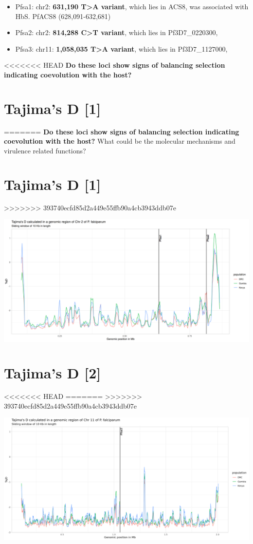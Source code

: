 \documentclass[11pt]{article}
\begin{document}
\begin{itemize}
\item Pfsa1: chr2: \textbf{631,190 T>A variant}, which lies in ACS8, was associated with HbS. PfACS8 (628,091-632,681)
\item Pfsa2: chr2: \textbf{814,288 C>T variant}, which lies in Pf3D7\_0220300,
\item Pfsa3: chr11: \textbf{1,058,035 T>A variant}, which lies in Pf3D7\_1127000,
\end{itemize}

<<<<<<< HEAD
\textbf{Do these loci show signs of balancing selection indicating coevolution with the host?}

\section{Tajima's D [1]}
\label{sec:org5204a2b}
=======
\textbf{Do these loci show signs of balancing selection indicating coevolution with the host?} What could be the molecular mechanisms and virulence related functions?

\section{Tajima's D [1]}
\label{sec:org183f418}
>>>>>>> 393740ecfd85d2a449e55ffb90a4cb3943ddb07e
\begin{center}
\includegraphics[width=.9\linewidth]{./output/TajD/png/Pf7.chr2.full.TajD_DRC_GM_KE.png}
\end{center}

\section{Tajima's D [2]}
<<<<<<< HEAD
\label{sec:org841cb6f}
=======
\label{sec:orgc2decba}
>>>>>>> 393740ecfd85d2a449e55ffb90a4cb3943ddb07e
\begin{center}
\includegraphics[width=.9\linewidth]{./output/TajD/png/Pf7.chr11.full.TajD_DRC_GM_KE.png}
\end{center}
\end{document}
